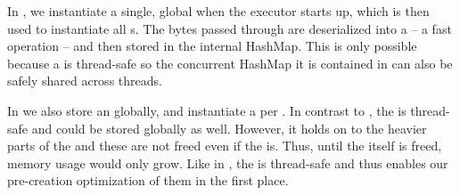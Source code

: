 \begin{description}[style=multiline, leftmargin=2.5cm, font=\bfseries]

    \item[Wasmtime] In , we instantiate a single, global  when the executor starts up, which is then used to instantiate all s. The bytes passed through  are deserialized into a  -- a fast operation -- and then stored in the internal HashMap. This is only possible because a  is thread-safe so the concurrent HashMap it is contained in can also be safely shared across threads.

    \item[Wasmer]  In  we also store an  globally, and instantiate a  per . In contrast to , the  is thread-safe and could be stored globally as well. However, it holds on to the heavier parts of the  and these are not freed even if the  is. Thus, until the  itself is freed, memory usage would only grow. Like in , the  is thread-safe and thus enables our pre-creation optimization of them in the first place.


\end{description}

